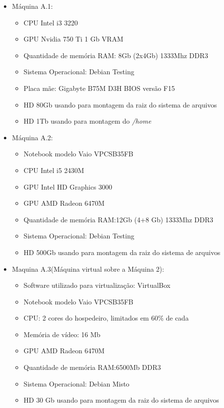 \begin{itemize}

\item Máquina A.1:%
\begin{itemize}
	\item \acrshort{CPU} Intel i3 3220
	\item \acrshort{GPU} Nvidia 750 Ti 1 Gb VRAM
	\item Quantidade de memória \acrshort{RAM}: 8Gb (2x4Gb) 1333Mhz DDR3
	\item Sistema Operacional: Debian Testing
	\item Placa mãe: Gigabyte B75M D3H BIOS versão F15
	\item HD 80Gb usando para montagem da raiz do sistema de arquivos 
	\item HD 1Tb usando para montagem do \textit{/home}
\end{itemize}

\item Máquina A.2:%

\begin{itemize}
	\item Notebook modelo Vaio VPCSB35FB
	\item \acrshort{CPU} Intel i5 2430M
	\item \acrshort{GPU} Intel HD Graphics 3000
	\item \acrshort{GPU} AMD Radeon 6470M
	\item Quantidade de memória \acrshort{RAM}:12Gb (4+8 Gb) 1333Mhz DDR3
	\item Sistema Operacional: Debian Testing
	\item HD 500Gb usando para montagem da raiz do sistema de arquivos 
\end{itemize}

\item Maquina A.3(Máquina virtual sobre a Máquina 2):%

\begin{itemize}
	\item Software utilizado para virtualização: VirtualBox
	\item Notebook modelo Vaio VPCSB35FB
	\item \acrshort{CPU}: 2 cores do hospedeiro, limitados em 60\% de cada
	\item Memória de vídeo: 16 Mb
	\item \acrshort{GPU} AMD Radeon 6470M
	\item Quantidade de memória \acrshort{RAM}:6500Mb DDR3
	\item Sistema Operacional: Debian Misto
	\item HD 30 Gb usando para montagem da raiz do sistema de arquivos 
\end{itemize}

\end{itemize}
